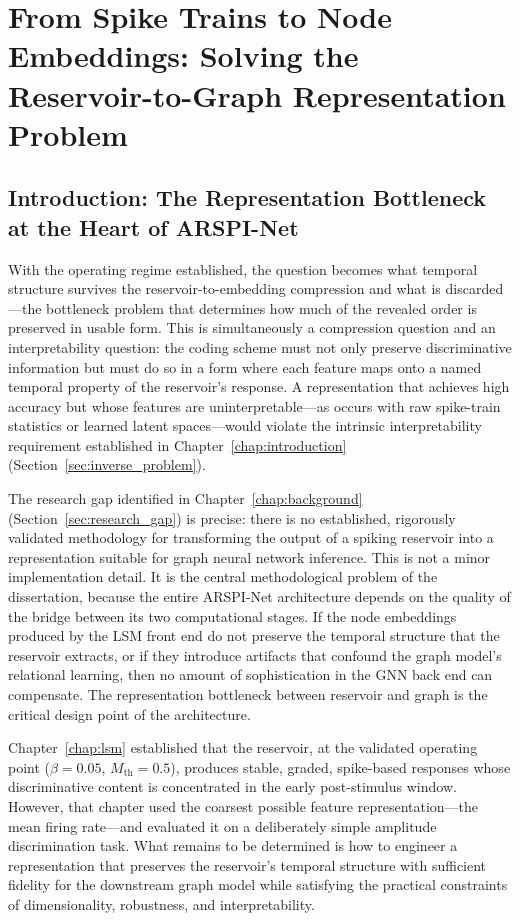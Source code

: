 \chapter{From Spike Trains to Node Embeddings: Solving the Reservoir-to-Graph Representation Problem}
\label{chap:embeddings}

\section{Introduction: The Representation Bottleneck at the Heart of ARSPI-Net}
\label{sec:ch4_intro}

With the operating regime established, the question becomes what temporal structure survives the reservoir-to-embedding compression and what is discarded---the bottleneck problem that determines how much of the revealed order is preserved in usable form. This is simultaneously a compression question and an interpretability question: the coding scheme must not only preserve discriminative information but must do so in a form where each feature maps onto a named temporal property of the reservoir's response. A representation that achieves high accuracy but whose features are uninterpretable---as occurs with raw spike-train statistics or learned latent spaces---would violate the intrinsic interpretability requirement established in Chapter~\ref{chap:introduction} (Section~\ref{sec:inverse_problem}).

The research gap identified in Chapter~\ref{chap:background} (Section~\ref{sec:research_gap}) is precise: there is no established, rigorously validated methodology for transforming the output of a spiking reservoir into a representation suitable for graph neural network inference. This is not a minor implementation detail. It is the central methodological problem of the dissertation, because the entire ARSPI-Net architecture depends on the quality of the bridge between its two computational stages. If the node embeddings produced by the LSM front end do not preserve the temporal structure that the reservoir extracts, or if they introduce artifacts that confound the graph model's relational learning, then no amount of sophistication in the GNN back end can compensate. The representation bottleneck between reservoir and graph is the critical design point of the architecture.

Chapter~\ref{chap:lsm} established that the reservoir, at the validated operating point ($\beta = 0.05$, $M_{\text{th}} = 0.5$), produces stable, graded, spike-based responses whose discriminative content is concentrated in the early post-stimulus window. However, that chapter used the coarsest possible feature representation---the mean firing rate---and evaluated it on a deliberately simple amplitude discrimination task. What remains to be determined is how to engineer a representation that preserves the reservoir's temporal structure with sufficient fidelity for the downstream graph model while satisfying the practical constraints of dimensionality, robustness, and interpretability.

